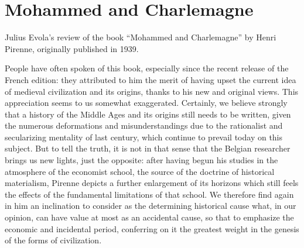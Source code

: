 \section{Mohammed and Charlemagne}

\begin{quotex}
Julius Evola's review of the book ``Mohammed and Charlemagne'' by Henri Pirenne, originally published in 1939.
\end{quotex}


People have often spoken of this book, especially since the recent release of the French edition: they attributed to him the merit of having upset the current idea of medieval civilization and its origins, thanks to his new and original views. This appreciation seems to us somewhat exaggerated. Certainly, we believe strongly that a history of the Middle Ages and its origins still needs to be written, given the numerous deformations and misunderstandings due to the rationalist and secularizing mentality of last century, which continue to prevail today on this subject. But to tell the truth, it is not in that sense that the Belgian researcher brings us new lights, just the opposite: after having begun his studies in the atmosphere of the economist school, the source of the doctrine of historical materialism, Pirenne depicts a further enlargement of its horizons which still feels the effects of the fundamental limitations of that school. We therefore find again in him an inclination to consider as the determining historical cause what, in our opinion, can have value at most as an accidental cause, so that to emphasize the economic and incidental period, conferring on it the greatest weight in the genesis of the forms of civilization.

